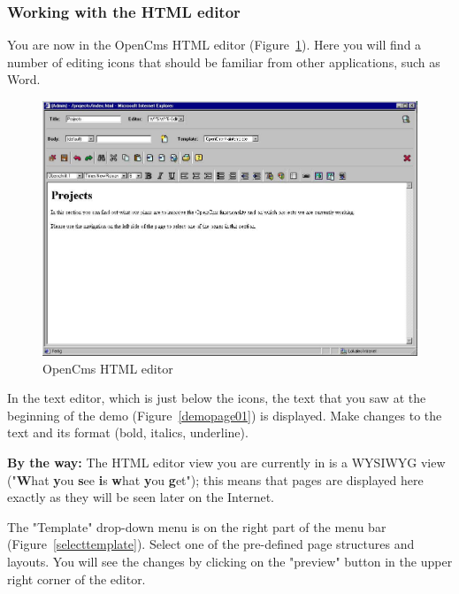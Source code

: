 \subsubsection{Working with the HTML editor}

You are now in the OpenCms HTML editor (Figure~\ref{htmleditor}).
Here you will find a number of editing icons that should be
familiar from other applications, such as Word.

\begin{figure}[h]
\begin{center}
\includegraphics[width=\sgw]
                   {pics/usermanual/htmlEditor}
\caption[OpenCms HTML editor]
           {OpenCms HTML editor}
\label{htmleditor}
\end{center}
\end{figure}

In the text editor, which is just below the icons, the text that
you saw at the beginning of the demo (Figure~\ref{demopage01}) is
displayed. Make changes to the text and its format (bold, italics,
underline).

\textbf{By the way:} The HTML editor view you are currently in is
a WYSIWYG view ("\textbf{W}hat \textbf{y}ou \textbf{s}ee
\textbf{i}s \textbf{w}hat \textbf{y}ou \textbf{g}et"); this means
that pages are displayed here exactly as they will be seen later
on the Internet.

The "Template" drop-down menu is on the right part of the menu bar
(Figure~\ref{selecttemplate}). Select one of the pre-defined page
structures and layouts. You will see the changes by clicking on
the "preview" button in the upper right corner of the editor.

